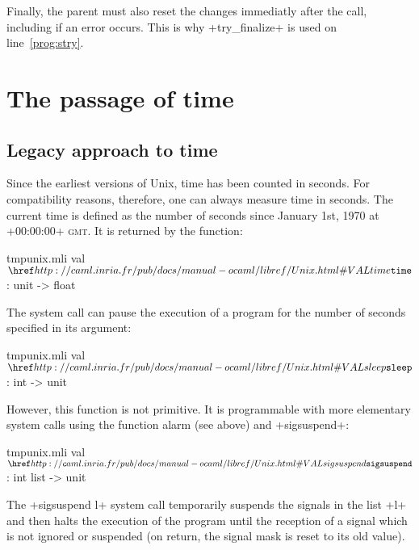 \begin{example}
Finally, the parent must also reset the changes immediatly after the
call, including if an error occurs. This is why
\ml+try_finalize+ is used on line~\ref{prog:stry}.
\end{example}


\section{The passage of time}

\subsection*{Legacy approach to time}

Since the earliest versions of Unix, time has been counted in seconds.
For compatibility reasons, therefore, one can always measure time in seconds.
The current time is defined as the number of seconds since January 1st, 1970
at \ml+00:00:00+ \textsc{gmt}.  It is returned by the function:

%
\begin{listingcodefile}{tmpunix.mli}
val $\indexlibvalue{Unix}{time}$ : unit -> float
\end{listingcodefile}
%

The  system call can pause the execution of a program
for the number of seconds specified in its argument:
%
\begin{listingcodefile}{tmpunix.mli}
val $\libvalue{Unix}{sleep}$ : int -> unit
\end{listingcodefile}
%

However, this function is not primitive. It is programmable with 
more elementary system calls using the function alarm (see 
above) and \ml+sigsuspend+: 

%
\begin{listingcodefile}{tmpunix.mli}
val $\libvalue{Unix}{sigsuspend}$ : int list -> unit
\end{listingcodefile}
%

The \ml+sigsuspend l+ system call temporarily suspends the signals in the 
list \ml+l+ and then halts the execution of the program until the reception 
of a signal which is not ignored or suspended (on return, the 
signal mask is reset to its old value).

